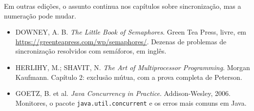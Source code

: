 \documentclass[11pt,a4paper]{article}
\newcommand{\cmd}[1]{\texttt{#1}}
\begin{document}
Em outras edições, o assunto continua nos capítulos sobre sincronização, mas a numeração pode mudar.

\begin{itemize}
    \item DOWNEY, A. B. \emph{The Little Book of Semaphores}. Green Tea Press, livre, em \url{https://greenteapress.com/wp/semaphores/}. Dezenas de problemas de sincronização resolvidos com semáforos, em inglês.
    \item HERLIHY, M.; SHAVIT, N. \emph{The Art of Multiprocessor Programming}. Morgan Kaufmann. Capítulo 2: exclusão mútua, com a prova completa de Peterson.
    \item GOETZ, B. et al. \emph{Java Concurrency in Practice}. Addison-Wesley, 2006. Monitores, o pacote \cmd{java.util.\allowbreak concurrent} e os erros mais comuns em Java.
\end{itemize}
\end{document}
